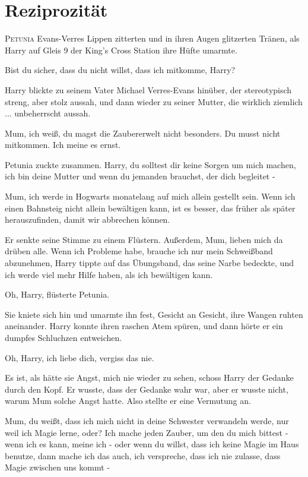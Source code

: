 \chapter{Reziprozität}

\lettrine{P}{etunia} Evans-Verres Lippen zitterten und in ihren Augen glitzerten
Tränen, als Harry auf Gleis 9 der King's Cross Station ihre Hüfte umarmte.

\glqq{}Bist du sicher, dass du nicht willst, dass ich mitkomme, Harry?\grqq{}

Harry blickte zu seinem Vater Michael Verres-Evans hinüber, der stereotypisch
streng, aber stolz aussah, und dann wieder zu seiner Mutter, die wirklich
ziemlich ... unbeherrscht aussah.

\glqq{}Mum, ich weiß, du magst die Zaubererwelt nicht besonders. Du musst nicht
mitkommen. Ich meine es ernst.\grqq{}

Petunia zuckte zusammen. \glqq{}Harry, du solltest dir keine Sorgen um mich
machen, ich bin deine Mutter und wenn du jemanden brauchst, der dich begleitet
-\grqq{}

\glqq{}Mum, ich werde in Hogwarts monatelang auf mich allein gestellt sein. Wenn
ich einen Bahnsteig nicht allein bewältigen kann, ist es besser, das früher als
später herauszufinden, damit wir abbrechen können.\grqq{}

Er senkte seine Stimme zu einem Flüstern. \glqq{}Außerdem, Mum, lieben mich da
drüben alle. Wenn ich Probleme habe, brauche ich nur mein Schweißband
abzunehmen\grqq{}, Harry tippte auf das Übungsband, das seine Narbe bedeckte,
\glqq{}und ich werde viel mehr Hilfe haben, als ich bewältigen kann.\grqq{}

\glqq{}Oh, Harry\grqq{}, flüsterte Petunia.

Sie kniete sich hin und umarmte ihn fest, Gesicht an Gesicht, ihre Wangen ruhten
aneinander. Harry konnte ihren raschen Atem spüren, und dann hörte er ein
dumpfes Schluchzen entweichen.

\glqq{}Oh, Harry, ich liebe dich, vergiss das nie.\grqq{}

Es ist, als hätte sie Angst, mich nie wieder zu sehen, schoss Harry der Gedanke
durch den Kopf. Er wusste, dass der Gedanke wahr war, aber er wusste nicht,
warum Mum solche Angst hatte. Also stellte er eine Vermutung an.

\glqq{}Mum, du weißt, dass ich mich nicht in deine Schwester verwandeln werde,
nur weil ich Magie lerne, oder? Ich mache jeden Zauber, um den du mich bittest -
wenn ich es kann, meine ich - oder wenn du willst, dass ich keine Magie im Haus
benutze, dann mache ich das auch, ich verspreche, dass ich nie zulasse, dass
Magie zwischen uns kommt -\grqq{}

